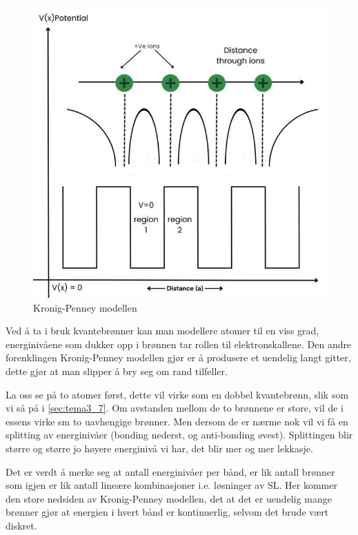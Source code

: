 \begin{figure}[!htb]
    \centering
    \includegraphics[scale=0.4]{Bilder/SamtaleTema5/kronigPenney.jpeg}
    \caption{Kronig-Penney modellen}
    \label{fig:KP}
\end{figure}

Ved å ta i bruk kvantebrønner kan man modellere atomer til en viss grad, energinivåene som dukker opp i brønnen tar rollen til elektronskallene. Den andre forenklingen Kronig-Penney modellen gjør er å produsere et uendelig langt gitter, dette gjør at man slipper å bry seg om rand tilfeller.

La oss se på to atomer først, dette vil virke som en dobbel kvantebrønn, slik som vi så på i \autoref{sec:tema3_7}. Om avstanden mellom de to brønnene er store, vil de i essens virke sm to uavhengige brønner. Men dersom de er nærme nok vil vi få en splitting av energinivåer (bonding nederst, og anti-bonding øvest). Splittingen blir større og større jo høyere energinivå vi har, det blir mer og mer lekkasje. 

Det er verdt å merke seg at antall energinivåer per bånd, er lik antall brønner som igjen er lik antall lineære kombinasjoner i.e. løsninger av SL. Her kommer den store nedsiden av Kronig-Penney modellen, det at det er uendelig mange brønner gjør at energien i hvert bånd er kontinuerlig, selvom det brude vært diskret.

